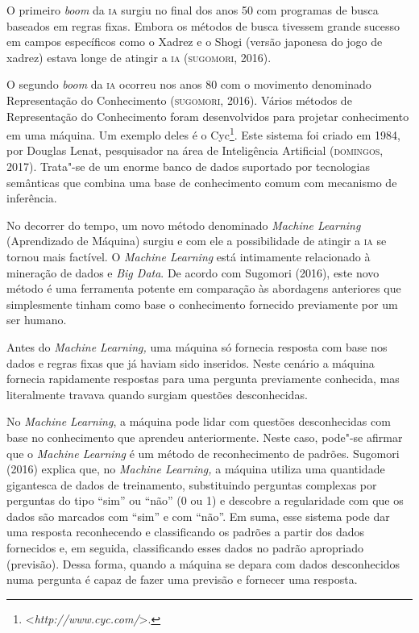 O primeiro \emph{boom} da \textsc{ia} surgiu no final dos anos 50 com programas
de busca baseados em regras fixas. Embora os métodos de busca tivessem
grande sucesso em campos específicos como o Xadrez e o Shogi (versão
japonesa do jogo de xadrez) estava longe de atingir a \textsc{ia} (\textsc{sugomori},
2016).

O segundo \emph{boom} da \textsc{ia} ocorreu nos anos 80 com o movimento
denominado Representação do Conhecimento (\textsc{sugomori}, 2016). Vários
métodos de Representação do Conhecimento foram desenvolvidos para
projetar conhecimento em uma máquina. Um exemplo deles é o Cyc\footnote{\textless{}\emph{http://www.cyc.com/}\textgreater{}.}.
Este sistema foi criado em 1984, por Douglas Lenat, pesquisador na área
de Inteligência Artificial (\textsc{domingos}, 2017). Trata"-se de um enorme banco
de dados suportado por tecnologias semânticas que combina uma base de
conhecimento comum com mecanismo de inferência.

No decorrer do tempo, um novo método denominado \emph{Machine Learning}
(Aprendizado de Máquina) surgiu e com ele a possibilidade de atingir a
\textsc{ia} se tornou mais factível. O \emph{Machine Learning} está intimamente
relacionado à mineração de dados e \emph{Big Data}. De acordo com
Sugomori (2016), este novo método é uma ferramenta potente em comparação
às abordagens anteriores que simplesmente tinham como base o
conhecimento fornecido previamente por um ser humano.

Antes do \emph{Machine Learning,} uma máquina só fornecia resposta com
base nos dados e regras fixas que já haviam sido inseridos. Neste
cenário a máquina fornecia rapidamente respostas para uma pergunta
previamente conhecida, mas literalmente travava quando surgiam questões
desconhecidas.

No \emph{Machine Learning}, a máquina pode lidar com questões
desconhecidas com base no conhecimento que aprendeu anteriormente. Neste
caso, pode"-se afirmar que o \emph{Machine Learning} é um método de
reconhecimento de padrões. Sugomori (2016) explica que, no \emph{Machine
Learning,} a máquina utiliza uma quantidade gigantesca de dados de
treinamento, substituindo perguntas complexas por perguntas do tipo
``sim'' ou ``não'' (0 ou 1) e descobre a regularidade com que os dados
são marcados com ``sim'' e com ``não''. Em suma, esse sistema pode dar
uma resposta reconhecendo e classificando os padrões a partir dos dados
fornecidos e, em seguida, classificando esses dados no padrão apropriado
(previsão). Dessa forma, quando a máquina se depara com dados
desconhecidos numa pergunta é capaz de fazer uma previsão e fornecer uma
resposta.

